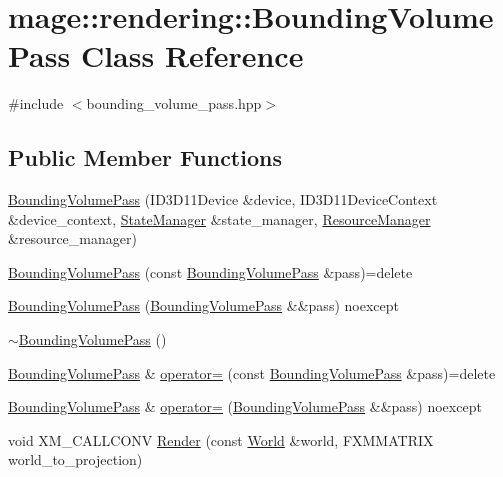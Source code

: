 \hypertarget{classmage_1_1rendering_1_1_bounding_volume_pass}{}\section{mage\+:\+:rendering\+:\+:Bounding\+Volume\+Pass Class Reference}
\label{classmage_1_1rendering_1_1_bounding_volume_pass}


{\ttfamily \#include $<$bounding\+\_\+volume\+\_\+pass.\+hpp$>$}

\subsection*{Public Member Functions}
\begin{DoxyCompactItemize}
\item 
\hyperlink{classmage_1_1rendering_1_1_bounding_volume_pass_ac612308d7f54297f2357b0071699979d}{Bounding\+Volume\+Pass} (I\+D3\+D11\+Device \&device, I\+D3\+D11\+Device\+Context \&device\+\_\+context, \hyperlink{classmage_1_1rendering_1_1_state_manager}{State\+Manager} \&state\+\_\+manager, \hyperlink{classmage_1_1rendering_1_1_resource_manager}{Resource\+Manager} \&resource\+\_\+manager)
\item 
\hyperlink{classmage_1_1rendering_1_1_bounding_volume_pass_a038625bc0d88f87debee24f888c5e8a5}{Bounding\+Volume\+Pass} (const \hyperlink{classmage_1_1rendering_1_1_bounding_volume_pass}{Bounding\+Volume\+Pass} \&pass)=delete
\item 
\hyperlink{classmage_1_1rendering_1_1_bounding_volume_pass_a16f91c871dabbf6904606abad24d551f}{Bounding\+Volume\+Pass} (\hyperlink{classmage_1_1rendering_1_1_bounding_volume_pass}{Bounding\+Volume\+Pass} \&\&pass) noexcept
\item 
\hyperlink{classmage_1_1rendering_1_1_bounding_volume_pass_a6a70806bfad252e2a6409c94a0de7da7}{$\sim$\+Bounding\+Volume\+Pass} ()
\item 
\hyperlink{classmage_1_1rendering_1_1_bounding_volume_pass}{Bounding\+Volume\+Pass} \& \hyperlink{classmage_1_1rendering_1_1_bounding_volume_pass_af6651287f16a21d755c8e304f4997fcf}{operator=} (const \hyperlink{classmage_1_1rendering_1_1_bounding_volume_pass}{Bounding\+Volume\+Pass} \&pass)=delete
\item 
\hyperlink{classmage_1_1rendering_1_1_bounding_volume_pass}{Bounding\+Volume\+Pass} \& \hyperlink{classmage_1_1rendering_1_1_bounding_volume_pass_a39c5dffd1a1381672e3dbc14eb07c8cf}{operator=} (\hyperlink{classmage_1_1rendering_1_1_bounding_volume_pass}{Bounding\+Volume\+Pass} \&\&pass) noexcept
\item 
void X\+M\+\_\+\+C\+A\+L\+L\+C\+O\+NV \hyperlink{classmage_1_1rendering_1_1_bounding_volume_pass_af3b780430cc6e79f21e64a2fc037a1e1}{Render} (const \hyperlink{classmage_1_1rendering_1_1_world}{World} \&world, F\+X\+M\+M\+A\+T\+R\+IX world\+\_\+to\+\_\+projection)
\end{DoxyCompactItemize}
